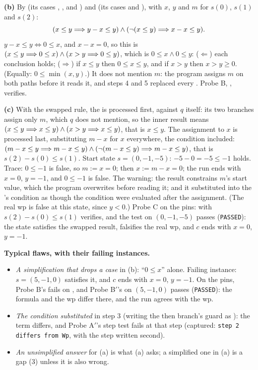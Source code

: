 \documentclass[11pt]{article}
\begin{document}
\textbf{(b)} By  (its cases , ,  and
) and  (its cases  and ), with $x$, $y$
and $m$ for $s(0)$, $s(1)$ and $s(2)$:
\[ (x \leq y \Longrightarrow y - x \leq y) \wedge (\neg(x \leq y) \Longrightarrow x - x \leq y). \]
$y - x \leq y \iff 0 \leq x$, and $x - x = 0$, so this is
$(x \leq y \Longrightarrow 0 \leq x) \wedge (x > y \Longrightarrow 0 \leq y)$, which is
$0 \leq x \wedge 0 \leq y$: ($\Leftarrow$) each conclusion holds; ($\Rightarrow$)
if $x \leq y$ then $0 \leq x \leq y$, and if $x > y$ then $x > y \geq 0$. (Equally:
$0 \leq \min(x, y)$.) It does not mention $m$: the program assigns $m$ on both
paths before it reads it, and steps 4 and 5 replaced every .
Probe B, , verifies.

\textbf{(c)} With the swapped rule, the  is processed first, against
$q$ itself: its two branches assign only $m$, which $q$ does not mention, so
the inner result means $(x \leq y \Longrightarrow x \leq y) \wedge (x > y \Longrightarrow x \leq
y)$, that is $x \leq y$. The assignment to $x$ is processed last, substituting
$m - x$ for $x$ everywhere, the condition included:
$(m - x \leq y \Longrightarrow m - x \leq y) \wedge (\neg(m - x \leq y) \Longrightarrow m - x \leq
y)$, that is $s(2) - s(0) \leq s(1)$. Start state $s = (0, -1, -5)$: $-5 - 0 =
-5 \leq -1$ holds. Trace: $0 \leq -1$ is false, so $m := x = 0$; then $x := m
- x = 0$; the run ends with $x = 0$, $y = -1$, and $0 \leq -1$ is false. The
warning: the result constrains $m$'s start value, which the program overwrites
before reading it; and it substituted into the 's condition as though
the condition were evaluated after the assignment. (The real wp is false at
this state, since $y < 0$.) Probe C on the pins:  with
$s(2) - s(0) \leq s(1)$ verifies, and the test  on
$(0, -1, -5)$ passes (\texttt{PASSED}): the state satisfies the swapped
result, falsifies the real wp, and $c$ ends with $x = 0$, $y = -1$.

\textbf{Typical flaws, with their failing instances.}
\begin{itemize}
\item \emph{A simplification that drops a case} in (b): ``$0 \leq x$'' alone.
  Failing instance: $s = (5, -1, 0)$ satisfies it, and $c$ ends with $x = 0$,
  $y = -1$. On the pins, Probe B's  fails on ,
  and Probe B$'$'s  on $(5, -1, 0)$ passes (\texttt{PASSED}):
  the formula and the wp differ there, and the run agrees with the wp.
\item \emph{The condition substituted} in step 3 (writing the then branch's
  guard as ): the term differs, and
  Probe A$'$'s step test fails at that step (captured: \texttt{step 2 differs
  from Wp}, with the  step written second).
\item \emph{An unsimplified answer} for (a) is what (a) asks; a simplified one
  in (a) is a gap (3) unless it is also wrong.
\end{itemize}
\end{document}

